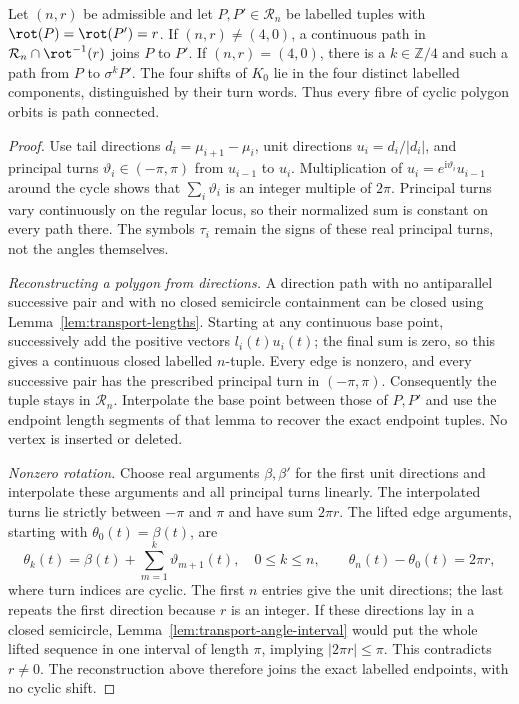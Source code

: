 \begin{theorem}\label{thm:mycyclic}\leanok
Let $(n,r)$ be admissible and let $P,P'\in\mathcal R_n$ be labelled tuples
with $\rot(P)=\rot(P')=r$. If $(n,r)\ne(4,0)$, a continuous path in
$\mathcal R_n\cap\rot^{-1}(r)$ joins $P$ to $P'$. If $(n,r)=(4,0)$,
there is a $k\in\mathbb Z/4$ and such a path from $P$ to $\sigma^kP'$.
The four shifts of $K_0$ lie in the four distinct labelled components,
distinguished by their turn words. Thus every fibre of cyclic polygon orbits
is path connected.

\end{theorem}
\begin{proof}\leanok{}
Use tail directions $d_i=\mu_{i+1}-\mu_i$, unit directions $u_i=d_i/|d_i|$,
and principal turns $\vartheta_i\in(-\pi,\pi)$ from $u_{i-1}$ to $u_i$.
Multiplication of $u_i=e^{\mathrm i\vartheta_i}u_{i-1}$ around the cycle
shows that $\sum_i\vartheta_i$ is an integer multiple of $2\pi$.
Principal turns vary continuously on the regular locus, so their normalized
sum is constant on every path there. The symbols $\tau_i$ remain the signs
of these real principal turns, not the angles themselves.

\emph{Reconstructing a polygon from directions.}
A direction path with no antiparallel successive pair and with no closed
semicircle containment can be closed using
Lemma~\ref{lem:transport-lengths}. Starting at any continuous base point,
successively add the positive vectors $l_i(t)u_i(t)$; the final sum is zero,
so this gives a continuous closed labelled $n$-tuple. Every edge is nonzero,
and every successive pair has the prescribed principal turn in $(-\pi,\pi)$.
Consequently the tuple stays in $\mathcal R_n$. Interpolate the base point
between those of $P,P'$ and use the endpoint length segments of that lemma
to recover the exact endpoint tuples. No vertex is inserted or deleted.

\emph{Nonzero rotation.}
Choose real arguments $\beta,\beta'$ for the first unit directions and
interpolate these arguments and all principal turns linearly. The interpolated
turns lie strictly between $-\pi$ and $\pi$ and have sum $2\pi r$.
The lifted edge arguments, starting with $\theta_0(t)=\beta(t)$, are
\begin{equation}\label{transport:prefix}
 \theta_k(t)=\beta(t)+\sum_{m=1}^{k}\vartheta_{m+1}(t),
 \quad 0\leq k\leq n,
 \qquad \theta_n(t)-\theta_0(t)=2\pi r,
\end{equation}
where turn indices are cyclic. The first $n$ entries give the unit directions;
the last repeats the first direction because $r$ is an integer. If these
directions lay in a closed semicircle,
Lemma~\ref{lem:transport-angle-interval} would put the whole lifted sequence
in one interval of length $\pi$, implying $|2\pi r|\leq\pi$.
This contradicts $r\ne0$. The reconstruction above therefore joins the exact
labelled endpoints, with no cyclic shift.


\end{proof}
